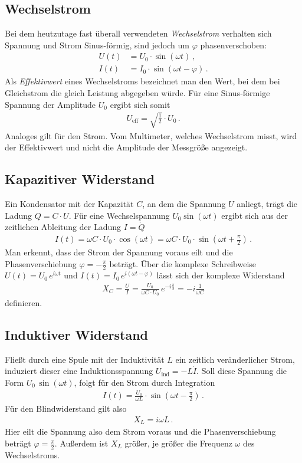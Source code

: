 \documentclass[12pt,a4paper,titlepage,headinclude,bibtotoc]{scrartcl}
\begin{document}
\subsection{Wechselstrom}
Bei dem heutzutage fast überall verwendeten \textit{Wechselstrom} verhalten sich Spannung und Strom Sinus-förmig, sind jedoch um $\varphi$ phasenverschoben:
\begin{align}
	U(t)&=U_0\cdot\sin(\omega t)\,,\\
	I(t)&=I_0\cdot\sin(\omega t-\varphi)\,.
\end{align}
Als \textit{Effektivwert} eines Wechselstroms bezeichnet man den Wert, bei dem bei Gleichstrom die gleich Leistung abgegeben würde.
Für eine Sinus-förmige Spannung der Amplitude $U_0$ ergibt sich somit
\begin{align}
	U_\text{eff}=\sqrt{\frac{1}{2}}\cdot U_0 \,.
\end{align}
Analoges gilt für den Strom.
Vom Multimeter, welches Wechselstrom misst, wird der Effektivwert und nicht die Amplitude der Messgröße angezeigt.

\subsection{Kapazitiver Widerstand}
Ein Kondensator mit der Kapazität $C$, an dem die Spannung $U$ anliegt, trägt die Ladung $Q=C\cdot U$.
Für eine Wechselspannung $U_0\sin(\omega t)$ ergibt sich aus der zeitlichen Ableitung der Ladung $I=\dot{Q}$
\begin{align}
	I(t)=\omega C\cdot U_0\cdot \cos(\omega t)=\omega C\cdot U_0\cdot\sin\left(\omega t+\frac{\pi}{2}\right)\,.
\end{align}
Man erkennt, dass der Strom der Spannung voraus eilt und die Phasenverschiebung $\varphi=-\frac{\pi}{2}$ beträgt.
Über die komplexe Schreibweise $U(t)=U_0 \, e^{i\omega t}$ und $I(t)=I_0 \, e^{i(\omega t - \varphi)}$ lässt sich der komplexe Widerstand
\begin{align}
	X_C=\frac{U}{I}= \frac{U_0}{\omega C \cdot U_0}\, e^{-i\frac{\pi}{2}}=-i\frac{1}{\omega C}
\end{align}
definieren.

\subsection{Induktiver Widerstand}
Fließt durch eine Spule mit der Induktivität $L$ ein zeitlich veränderlicher Strom, induziert dieser eine Induktionsspannung $U_\text{ind}=-L\dot{I}$.
Soll diese Spannung die Form $U_0\,\sin(\omega t)$, folgt für den Strom durch Integration
\begin{align}
	I(t)=\frac{U_0}{\omega L}\cdot \sin\left(\omega t-\frac{\pi}{2}\right)\,.
\end{align}
Für den Blindwiderstand gilt also
\begin{align}
	X_L=i\omega L \,.
\end{align}
Hier eilt die Spannung also dem Strom voraus und die Phasenverschiebung beträgt $\varphi=\frac{\pi}{2}$.
Außerdem ist $X_L$ größer, je größer die Frequenz $\omega$ des Wechselstroms.
\end{document}

